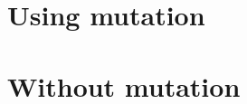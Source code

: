 \section{Using mutation} \label{sec:mutation}




\section{Without mutation} \label{sec:noMutation}
%


